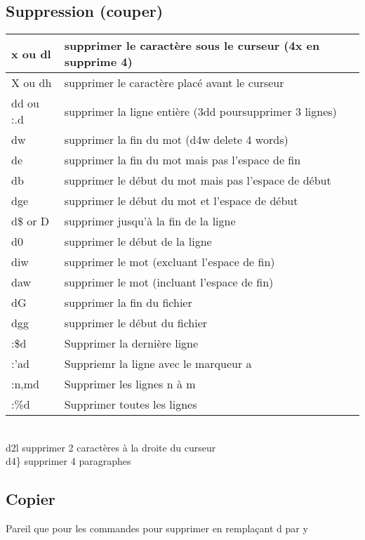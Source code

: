 \documentclass{article}
\begin{document}
\subsection{Suppression (couper)}
\begin{tabular}{|p{3cm}| l| }\hline
x ou dl & supprimer le caractère sous le curseur (4x en supprime 4)\\ \hline
X ou dh & supprimer le caractère placé avant le curseur\\ \hline
dd ou :.d & supprimer la ligne entière (3dd poursupprimer 3 lignes)\\ \hline
dw & supprimer la fin du mot (d4w delete 4 words)\\ \hline
de & supprimer la fin du mot mais pas l'espace de fin \\ \hline
db & supprimer le début du mot mais pas l'espace de début\\ \hline
dge & supprimer le début du mot et l'espace de début\\ \hline
d\$ or D & supprimer jusqu'à la fin de la ligne\\ \hline
d0 & supprimer le début de la ligne\\ \hline
diw & supprimer le mot (excluant l'espace de fin)\\ \hline
daw & supprimer le mot (incluant l'espace de fin)\\ \hline
dG & supprimer la fin du fichier\\ \hline
dgg & supprimer le début du fichier\\ \hline
:\$d & Supprimer la dernière ligne \\ \hline
:'ad & Suppriemr la ligne avec le marqueur a \\ \hline
:n,md & Supprimer les lignes n à m \\ \hline
:\%d & Supprimer toutes les lignes  \\ \hline
\end{tabular}\\


d2l supprimer 2 caractères à la droite du curseur\\
d4\} supprimer 4 paragraphes\\

\subsection{Copier}
Pareil que pour les commandes pour supprimer en remplaçant d par y\\
\end{document}
